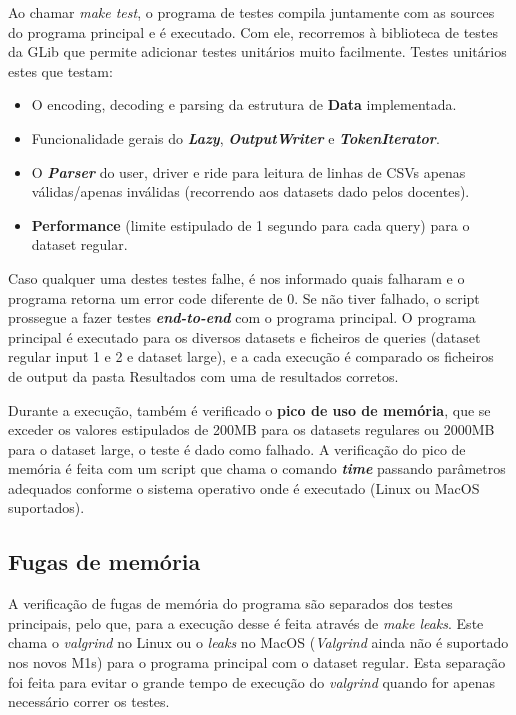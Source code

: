 \documentclass{article}
\begin{document}
        \medskip
        Ao chamar \textit{make test}, o programa de testes compila juntamente com as sources do programa principal e é executado.
        Com ele, recorremos à biblioteca de testes da GLib que permite adicionar testes unitários
        muito facilmente. Testes unitários estes que testam:
        \begin{itemize}
            \item O encoding, decoding e parsing da estrutura de \textbf{Data} implementada.
            \item Funcionalidade gerais do \textit{\textbf{Lazy}}, \textit{\textbf{OutputWriter}} e \textit{\textbf{TokenIterator}}.
            \item O \textit{\textbf{Parser}} do user, driver e ride para leitura de linhas de CSVs apenas válidas/apenas inválidas (recorrendo aos datasets dado pelos docentes).
            \item \textbf{Performance} (limite estipulado de 1 segundo para cada query) para o dataset regular.
        \end{itemize}
        Caso qualquer uma destes testes falhe, é nos informado quais falharam e o programa retorna um error code diferente de 0.
        Se não tiver falhado, o script prossegue a fazer testes \textit{\textbf{end-to-end}} com o programa principal.
        O programa principal é executado para os diversos datasets e ficheiros de queries (dataset regular input 1 e 2 e dataset large),
        e a cada execução é comparado os ficheiros de output da pasta Resultados com uma de resultados corretos.
        
        Durante a execução, também é verificado o \textbf{pico de uso de memória}, que se exceder os valores estipulados de 
        200MB para os datasets regulares ou 2000MB para o dataset large, o teste é dado como falhado.
        A verificação do pico de memória é feita com um script que chama o comando \textit{\textbf{time}}
        passando parâmetros adequados conforme o sistema operativo onde é executado (Linux ou MacOS suportados).
        
        \subsection{Fugas de memória}
        A verificação de fugas de memória do programa são separados dos testes principais, pelo que,
        para a execução desse é feita através de \textit{make leaks}. Este chama o \textit{valgrind}
        no Linux ou o \textit{leaks} no MacOS (\textit{Valgrind} ainda não é suportado nos novos M1s) para 
        o programa principal com o dataset regular. Esta separação foi feita para evitar o grande
        tempo de execução do \textit{valgrind} quando for apenas necessário correr os testes.
        
\end{document}
